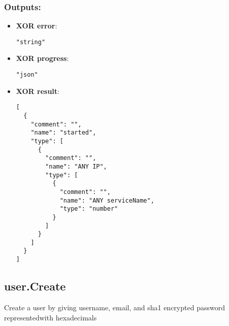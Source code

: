 \subsubsection*{Outputs:}
\begin{itemize}
    \item \textbf{XOR error}: 
\begin{lstlisting}
"string"
\end{lstlisting}
    \item \textbf{XOR progress}: 
\begin{lstlisting}
"json"
\end{lstlisting}
    \item \textbf{XOR result}: 
\begin{lstlisting}
[
  {
    "comment": "", 
    "name": "started", 
    "type": [
      {
        "comment": "", 
        "name": "ANY IP", 
        "type": [
          {
            "comment": "", 
            "name": "ANY serviceName", 
            "type": "number"
          }
        ]
      }
    ]
  }
]
\end{lstlisting}
  \end{itemize}

\subsection{user.Create}
Create a user by giving username, email, and sha1 encrypted password representedwith hexadecimals
